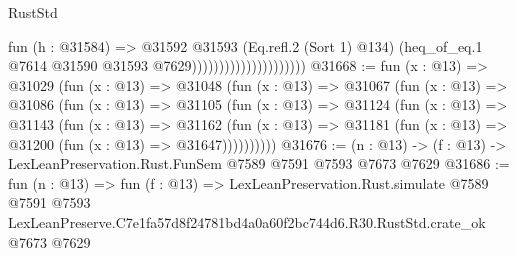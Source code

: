 \begin{lexlean}{RustStd}
\begin{coremodule}
                                          fun (h : @31584) =>
                                          @31592
                                            @31593
                                            (Eq.refl.{2} (Sort 1) @134)
                                            (heq_of_eq.{1}
                                              @7614
                                              @31590
                                              @31593
                                              @7629)))))))))))))))))))))
@31668 := fun (x : @13) =>
  @31029
    (fun (x : @13) =>
    @31048
      (fun (x : @13) =>
      @31067
        (fun (x : @13) =>
        @31086
          (fun (x : @13) =>
          @31105
            (fun (x : @13) =>
            @31124
              (fun (x : @13) =>
              @31143
                (fun (x : @13) =>
                @31162
                  (fun (x : @13) =>
                  @31181 (fun (x : @13) => @31200 (fun (x : @13) => @31647))))))))))
@31676 := (n : @13) -> (f : @13) -> LexLeanPreservation.Rust.FunSem @7589 @7591 @7593 @7673 @7629
@31686 := fun (n : @13) =>
  fun (f : @13) =>
  LexLeanPreservation.Rust.simulate
    @7589
    @7591
    @7593
    LexLeanPreserve.C7e1fa57d8f24781bd4a0a60f2bc744d6.R30.RustStd.crate_ok
    @7673
    @7629
\end{coremodule}
\end{lexlean}
